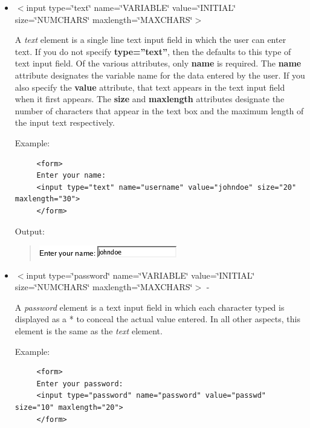 \begin{itemize}

\item $<$input {}type=\char`\"{}text\char`\"{}
name=\char`\"{}VARIABLE\char`\"{} value=\char`\"{}INITIAL\char`\"{}
size=\char`\"{}NUMCHARS\char`\"{} maxlength=\char`\"{}MAXCHARS\char`\"{}$>$ 


A \textit{text} element is a single line text input field in which
the user can enter text. If you do not specify \textbf{type=''text''},
then the  defaults to this type of text input field. Of the
various attributes, only \textbf{name} is required. The \textbf{name}
attribute designates the variable name for the data entered by the
user. If you also specify the \textbf{value} attribute, that text
appears in the text input field when it first appears. The \textbf{size}
and \textbf{maxlength} attributes designate the number of characters
that appear in the text box and the maximum length of the input text
respectively.

Example:

\begin{footnotesize}
\begin{verbatim}
     <form> 
     Enter your name: 
     <input type="text" name="username" value="johndoe" size="20" maxlength="30"> 
     </form>
\end{verbatim}
\end{footnotesize}

Output:


\begin{quote}
\includegraphics[scale=0.5]{figs/EnterYourName2}
\end{quote}
\item $<$input type=\char`\"{}password\char`\"{} name=\char`\"{}VARIABLE\char`\"{}
value=\char`\"{}INITIAL\char`\"{} size=\char`\"{}NUMCHARS\char`\"{}
maxlength=\char`\"{}MAXCHARS\char`\"{}$>$ -


A \textit{password} element is a text input field in which each character
typed is displayed as a {*} to conceal the actual value entered. In
all other aspects, this element is the same as the \textit{text} element.

Example:

\begin{footnotesize}
\begin{verbatim}
     <form> 
     Enter your password: 
     <input type="password" name="password" value="passwd" size="10" maxlength="20"> 
     </form>
\end{verbatim}
\end{footnotesize}


\end{itemize}
